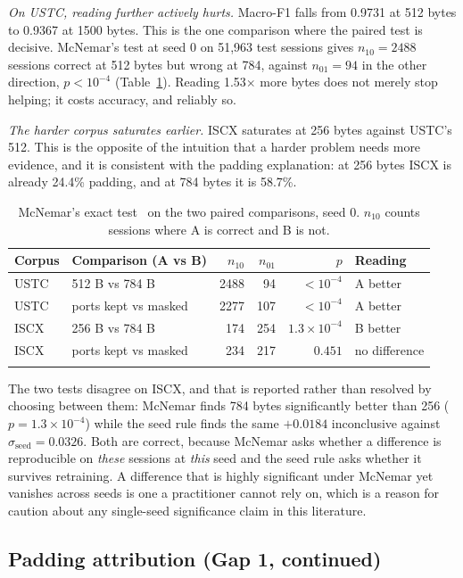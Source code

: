 \documentclass[pdflatex,sn-mathphys-num]{sn-jnl}
\theoremstyle{thmstyleone}%
\theoremstyle{thmstylethree}%
\begin{document}
\emph{On USTC, reading further actively hurts.} Macro-F1 falls from 0.9731 at
512 bytes to 0.9367 at 1500 bytes. This is the one comparison where the paired
test is decisive. McNemar's test at seed 0 on 51{,}963 test sessions gives
$n_{10} = 2488$ sessions correct at 512 bytes but wrong at 784, against
$n_{01} = 94$ in the other direction, $p < 10^{-4}$
(Table~\ref{tab:mcnemar}). Reading 1.53$\times$ more bytes does not merely stop
helping; it costs accuracy, and reliably so.

\emph{The harder corpus saturates earlier.} ISCX saturates at 256 bytes
against USTC's 512. This is the opposite of the intuition that a harder problem
needs more evidence, and it is consistent with the padding explanation: at 256
bytes ISCX is already 24.4\% padding, and at 784 bytes it is 58.7\%.

\begin{table}[tbp]
\caption{McNemar's exact test~\cite{mcnemar} on the two paired comparisons,
seed 0. $n_{10}$ counts sessions where A is correct and B is not.}\label{tab:mcnemar}
\begin{tabular}{@{}llrrrl@{}}
\toprule
Corpus & Comparison (A vs B) & $n_{10}$ & $n_{01}$ & $p$ & Reading \\
\midrule
USTC & 512 B vs 784 B & 2488 & 94 & $<10^{-4}$ & A better \\
USTC & ports kept vs masked & 2277 & 107 & $<10^{-4}$ & A better \\
ISCX & 256 B vs 784 B & 174 & 254 & $1.3\times10^{-4}$ & B better \\
ISCX & ports kept vs masked & 234 & 217 & $0.451$ & no difference \\
\botrule
\end{tabular}
\end{table}

The two tests disagree on ISCX, and that is reported rather than resolved by
choosing between them: McNemar finds 784 bytes significantly better than 256
($p = 1.3\times10^{-4}$) while the seed rule finds the same $+0.0184$
inconclusive against $\sigma_{\text{seed}} = 0.0326$. Both are correct, because
McNemar asks whether a difference is reproducible on \emph{these} sessions at
\emph{this} seed and the seed rule asks whether it survives retraining. A
difference that is highly significant under McNemar yet vanishes across seeds
is one a practitioner cannot rely on, which is a reason for caution about any
single-seed significance claim in this literature.

\subsection{Padding attribution (Gap 1, continued)}
\end{document}
